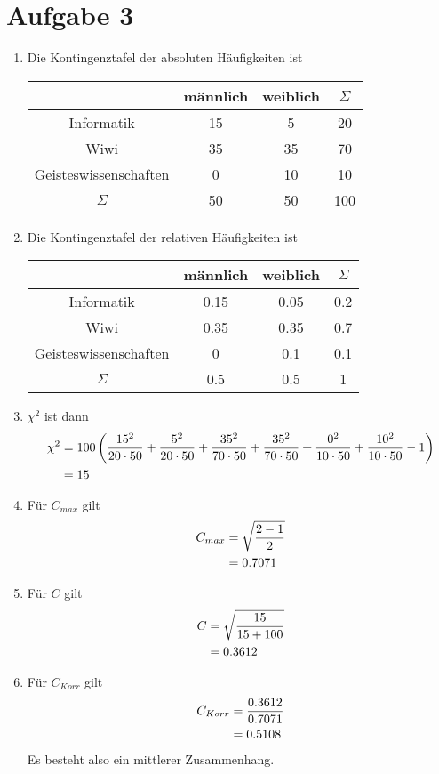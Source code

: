 \documentclass{article}
\begin{document}
	\section*{Aufgabe 3}
	\begin{enumerate}[label=(\alph*)]
		\item Die Kontingenztafel der absoluten Häufigkeiten ist
		\begin{center}
			\begin{tabular}{c|cc|c}
				& männlich & weiblich & $\Sigma$ \\
				\hline
				Informatik & 15 & 5 & 20 \\
				Wiwi & 35 & 35 & 70 \\
				Geisteswissenschaften & 0 & 10 & 10 \\
				\hline
				$\Sigma$ & 50 & 50 & 100 
			\end{tabular}
		\end{center}
		\item Die Kontingenztafel der relativen Häufigkeiten ist
		\begin{center}
			\begin{tabular}{c|cc|c}
				& männlich & weiblich & $\Sigma$ \\
				\hline
				Informatik & 0.15 & 0.05 & 0.2 \\
				Wiwi & 0.35 & 0.35 & 0.7 \\
				Geisteswissenschaften & 0 & 0.1 & 0.1 \\
				\hline
				$\Sigma$ & 0.5 & 0.5 & 1 
			\end{tabular}
		\end{center}
		\item $\chi^2$ ist dann
		\begin{align}
			\chi^2 &= 100\left(\frac{15^2}{20\cdot 50} + \frac{5^2}{20\cdot 50} + \frac{35^2}{70\cdot 50} + \frac{35^2}{70\cdot 50} + \frac{0^2}{10\cdot 50} + \frac{10^2}{10\cdot 50}-1\right) \notag \\
			&= 15 \notag
		\end{align}
		\item Für $C_{max}$ gilt
		\begin{align}
			C_{max} &= \sqrt{\frac{2-1}{2}} \notag \\
			&= 0.7071 \notag
		\end{align}
		\item Für $C$ gilt
		\begin{align}
			C &= \sqrt{\frac{15}{15+100}} \notag \\
			&= 0.3612 \notag
		\end{align}
		\item Für $C_{Korr}$ gilt
		\begin{align}
			C_{Korr} &= \frac{0.3612}{0.7071} \notag \\
			&= 0.5108 \notag
		\end{align}
		Es besteht also ein mittlerer Zusammenhang.
	\end{enumerate}
\end{document}
